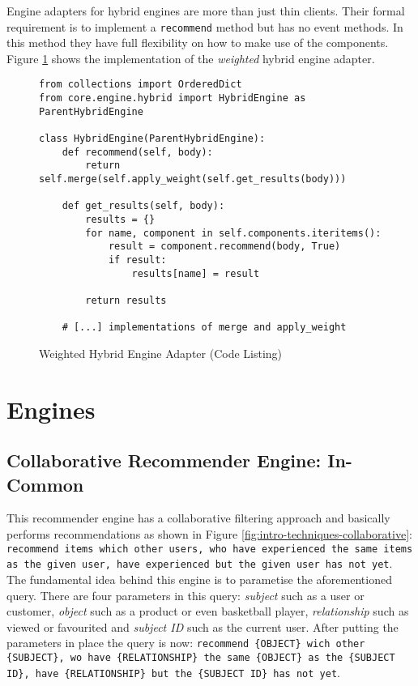 Engine adapters for hybrid engines are more than just thin clients. Their formal requirement is to implement a \texttt{recommend} method but has no event methods. In this method they have full flexibility on how to make use of the components. Figure \ref{fig:implementation-framework-hybrid-engine-adapter} shows the implementation of the \emph{weighted} hybrid engine adapter.

\begin{figure}[!ht]
    \begin{verbatim}
from collections import OrderedDict
from core.engine.hybrid import HybridEngine as ParentHybridEngine

class HybridEngine(ParentHybridEngine):
    def recommend(self, body):
        return self.merge(self.apply_weight(self.get_results(body)))

    def get_results(self, body):
        results = {}
        for name, component in self.components.iteritems():
            result = component.recommend(body, True)
            if result:
                results[name] = result

        return results

    # [...] implementations of merge and apply_weight
    \end{verbatim}
    \caption{Weighted Hybrid Engine Adapter (Code Listing)}
    \label{fig:implementation-framework-hybrid-engine-adapter}
\end{figure}



\section{Engines}

\subsection{Collaborative Recommender Engine: In-Common}

This recommender engine has a collaborative filtering approach and basically performs recommendations as shown in Figure \ref{fig:intro-techniques-collaborative}: \texttt{recommend items which other users, who have experienced the same items as the given user, have experienced but the given user has not yet}. The fundamental idea behind this engine is to parametise the aforementioned query. There are four parameters in this query: \emph{subject} such as a user or customer, \emph{object} such as a product or even basketball player, \emph{relationship} such as viewed or favourited and \emph{subject ID} such as the current user. After putting the parameters in place the query is now: \texttt{recommend \{OBJECT\} wich other \{SUBJECT\}, wo have \{RELATIONSHIP\} the same \{OBJECT\} as the \{SUBJECT ID\}, have \{RELATIONSHIP\} but the \{SUBJECT ID\} has not yet}.

